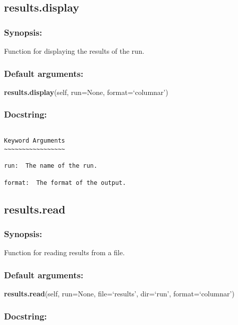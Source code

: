 \newpage

\subsection{results.display}


\subsubsection{Synopsis:}

Function for displaying the results of the run.

\subsubsection{Default arguments:}

\textsf{\textbf{results.display}(self, run=None, format=`columnar')
}


\subsubsection{Docstring:}

{\scriptsize
\begin{verbatim}

Keyword Arguments
~~~~~~~~~~~~~~~~~

run:  The name of the run.

format:  The format of the output.
\end{verbatim}
}



\newpage

\subsection{results.read}


\subsubsection{Synopsis:}

Function for reading results from a file.

\subsubsection{Default arguments:}

\textsf{\textbf{results.read}(self, run=None, file=`results', dir=`run', format=`columnar')
}


\subsubsection{Docstring:}

